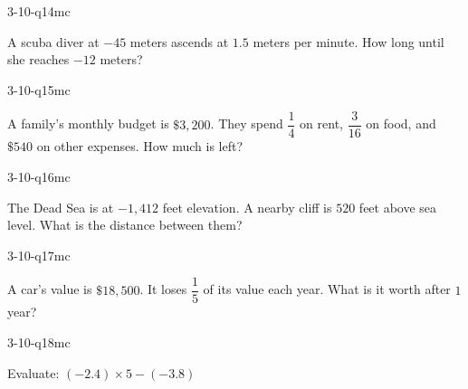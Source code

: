 \begin{practiceQuestion}{3-10-q14}{mc}
\begin{questionText}
A scuba diver at $-45$ meters ascends at $1.5$ meters per minute. How long until she reaches $-12$ meters?
\end{questionText}
\end{practiceQuestion}

\begin{practiceQuestion}{3-10-q15}{mc}
\begin{questionText}
A family's monthly budget is $\$3{,}200$. They spend $\dfrac{1}{4}$ on rent, $\dfrac{3}{16}$ on food, and $\$540$ on other expenses. How much is left?
\end{questionText}
\end{practiceQuestion}

\begin{practiceQuestion}{3-10-q16}{mc}
\begin{questionText}
The Dead Sea is at $-1{,}412$ feet elevation. A nearby cliff is $520$ feet above sea level. What is the distance between them?
\end{questionText}
\end{practiceQuestion}

\begin{practiceQuestion}{3-10-q17}{mc}
\begin{questionText}
A car's value is $\$18{,}500$. It loses $\dfrac{1}{5}$ of its value each year. What is it worth after $1$ year?
\end{questionText}
\end{practiceQuestion}

\begin{practiceQuestion}{3-10-q18}{mc}
\begin{questionText}
Evaluate: $(-2.4) \times 5 - (-3.8)$
\end{questionText}
\end{practiceQuestion}

